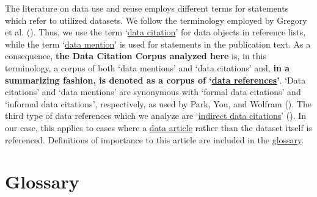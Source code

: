 \documentclass[
  letterpaper,
  DIV=11,
  numbers=noendperiod]{scrartcl}
\begin{document}
The literature on data use and reuse employs different terms for
statements which refer to utilized datasets. We follow the terminology
employed by Gregory et al. (). Thus, we
use the term `\hyperref[gls-data-citation]{data citation}' for data
objects in reference lists, while the term
`\hyperref[gls-data-mention]{data mention}' is used for statements in
the publication text. As a consequence, \textbf{the Data Citation Corpus
analyzed here} is, in this terminology, a corpus of both `data mentions'
and `data citations' and, \textbf{in a summarizing fashion, is denoted
as a corpus of `\hyperref[gls-data-reference]{data references}'}. `Data
citations' and `data mentions' are synonymous with `formal data
citations' and `informal data citations', respectively, as used by Park,
You, and Wolfram (). The third type of data
references which we analyze are
`\hyperref[gls-indirect-data-citation]{indirect data citations}'
(). In our case, this applies
to cases where a \hyperref[gls-data-article]{data article} rather than
the dataset itself is referenced. Definitions of importance to this
article are included in the \hyperref[glossary]{glossary}.

\edef\GlossarySavedSection{\number\value{section}}
\edef\GlossarySavedSubsection{\number\value{subsection}}
\edef\GlossarySavedSubsubsection{\number\value{subsubsection}}
\edef\GlossarySavedHTable{\theHtable}

\section*{Glossary}\label{glossary}

\begingroup
\let\GlossaryOriginalRaggedRight\raggedright
\renewcommand{\raggedright}{\GlossaryOriginalRaggedRight\rightskip=0pt}
\end{document}
